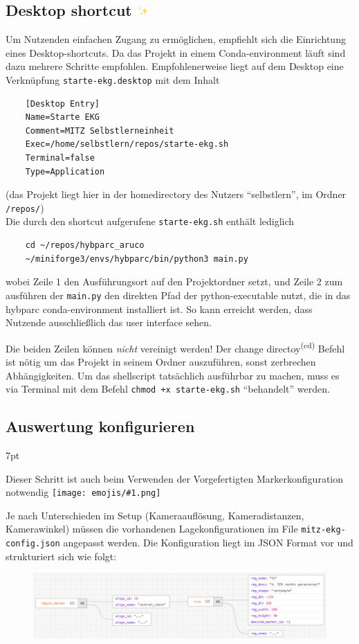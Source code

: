 \documentclass[a4paper, 10pt]{article}
\newcommand{\code}[1]{\texttt{#1}}
\newcommand{\emoji}[1]{
    \begingroup\normalfont
    \texttt{[image: emojis/\#1.png]}
    \endgroup
}
\newenvironment{tooltip}{%
\small
\vspace*{-4mm}
    \def\FrameCommand{%
    \hspace{1pt}%
    {\color{tooltippipe}\vrule width 0.7mm}%
    {\color{tooltipshade}\vrule width 1.5mm}%
    \colorbox{tooltipshade}%
    }%
    \MakeFramed{\advance\hsize-\width\FrameRestore}%
    \noindent%
    \begin{adjustwidth}{}{7pt}%
    \vspace{2pt}\vspace{2pt}%
}
{%
    \vspace{2pt}\end{adjustwidth}\endMakeFramed%
}
\begin{document}
\subsection{Desktop shortcut \includegraphics[height=0.75em]{emojis/sparkles.png}}
\label{ssec:desktop-drip}
Um Nutzenden einfachen Zugang zu ermöglichen, empfiehlt sich die Einrichtung eines Desktop-shortcuts. Da das Projekt in einem Conda-environment läuft sind dazu mehrere Schritte empfohlen. Empfohlenerweise liegt auf dem Desktop eine Verknüpfung \code{starte-ekg.desktop} mit dem Inhalt
\begin{verbatim}
    [Desktop Entry]
    Name=Starte EKG
    Comment=MITZ Selbstlerneinheit
    Exec=/home/selbstlern/repos/starte-ekg.sh
    Terminal=false
    Type=Application
\end{verbatim}
{\footnotesize(das Projekt liegt hier in der homedirectory des Nutzers \enquote{selbstlern}, im Ordner \code{/repos/})}\\
Die durch den shortcut aufgerufene \code{starte-ekg.sh} enthält lediglich
\begin{verbatim}
    cd ~/repos/hybparc_aruco
    ~/miniforge3/envs/hybparc/bin/python3 main.py
\end{verbatim}
wobei Zeile 1 den Ausführungsort auf den Projektordner setzt, und Zeile 2 zum ausführen der \code{main.py} den direkten Pfad der python-executable nutzt, die in das hybparc conda-environment installiert ist. So kann erreicht werden, dass Nutzende ausschließlich das user interface sehen.

Die beiden Zeilen können \emph{nicht} vereinigt werden! Der change directoy\textsuperscript{(cd)} Befehl ist nötig um das Projekt in seinem Ordner auszuführen, sonst zerbrechen Abhängigkeiten. Um das shellscript tatsächlich ausführbar zu machen, muss es via Terminal mit dem Befehl \code{chmod +x starte-ekg.sh} \enquote{behandelt} werden.

\subsection{Auswertung konfigurieren}
\label{ssec:configure-configuration}
\begin{tooltip}
    Dieser Schritt ist auch beim Verwenden der Vorgefertigten Markerkonfiguration notwendig\emoji{head-shaking-vertically}
\end{tooltip}
Je nach Unterschieden im Setup (Kameraauflösung, Kameradistanzen, Kamerawinkel) müssen die vorhandenen Lagekonfigurationen im File \code{mitz-ekg-config.json} angepasst werden. Die Konfiguration liegt im JSON Format vor und strukturiert sich wie folgt:
\begin{figure}[H]
    \centering
    \includegraphics[width=13.5cm]{json-tree.png}
\end{figure}
\end{document}
